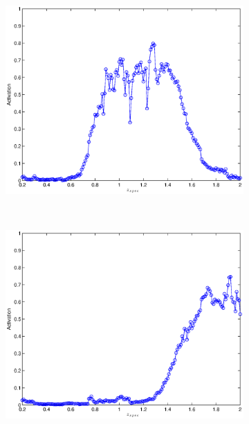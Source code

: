 \documentclass[useAMS,usenatbib,fleqn]{mn2e}
\begin{document}
\begin{figure}
        
        \begin{subfigure}[b]{0.175\textwidth}
                \includegraphics[width=\textwidth]{figures/activation_01.eps}
        \end{subfigure}
	~
        \begin{subfigure}[b]{0.175\textwidth}
                \includegraphics[width=\textwidth]{figures/activation_02.eps}
        \end{subfigure}
        ~
        \begin{subfigure}[b]{0.175\textwidth}

\end{subfigure}
\end{figure}
\end{document}
